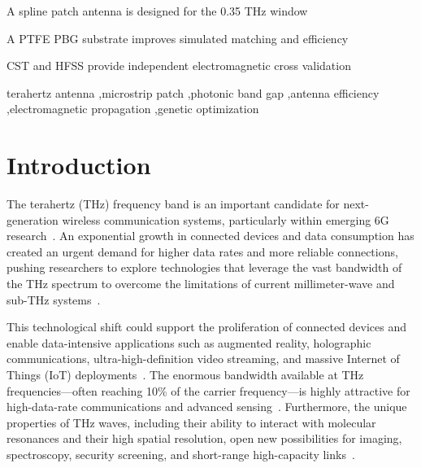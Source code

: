 \documentclass[a4paper,fleqn]{cas-dc}
\begin{document}
\begin{highlights}
\item A spline patch antenna is designed for the 0.35 THz window
\item A PTFE PBG substrate improves simulated matching and efficiency
\item CST and HFSS provide independent electromagnetic cross validation
\end{highlights}

\begin{keywords}
terahertz antenna \sep microstrip patch \sep photonic band gap \sep antenna efficiency \sep electromagnetic propagation \sep genetic optimization
\end{keywords}

\maketitle

\section{Introduction}
The terahertz (THz) frequency band is an important candidate for next-generation wireless communication systems, particularly within emerging 6G research~\cite{strinati_6g_2019,he_overview_2020}. An exponential growth in connected devices and data consumption has created an urgent demand for higher data rates and more reliable connections, pushing researchers to explore technologies that leverage the vast bandwidth of the THz spectrum to overcome the limitations of current millimeter-wave and sub-THz systems~\cite{jamshed_antenna_2020,hajiyat_antenna_2021}.

This technological shift could support the proliferation of connected devices and enable data-intensive applications such as augmented reality, holographic communications, ultra-high-definition video streaming, and massive Internet of Things (IoT) deployments~\cite{jornet_internet_2012,amin_step_2022}. The enormous bandwidth available at THz frequencies---often reaching 10\% of the carrier frequency---is highly attractive for high-data-rate communications and advanced sensing~\cite{sen_physical_2022}. Furthermore, the unique properties of THz waves, including their ability to interact with molecular resonances and their high spatial resolution, open new possibilities for imaging, spectroscopy, security screening, and short-range high-capacity links~\cite{nissanov_terahertz_2023,krishna_rhombus_2021}.
\end{document}
